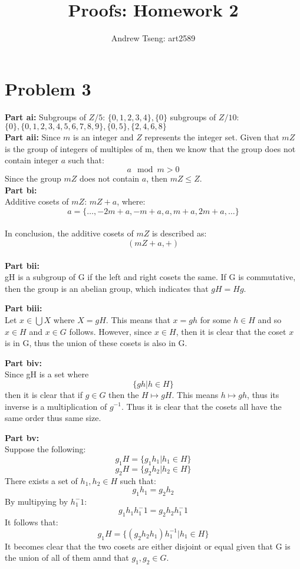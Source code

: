\documentclass[10pt]{amsart}
\title{Proofs: Homework 2}
\author{Andrew Tseng: art2589}
\begin{document}
\maketitle
\thispagestyle{empty}

\section*{\large \textbf{Problem 3}}

\begin{addmargin}{5pt}    
\textbf{\large Part ai:} Subgroups of $Z/5$: $\{0,1,2,3,4\}, \{0\}$
subgroups of $Z/10$: $\{0\}, \{0,1,2,3,4,5,6,7,8,9\}, \{0,5\}, \{2,4,6,8\}$ \\

\noindent \textbf{\large Part aii:} Since $m$ is an integer and $Z$ represents 
the integer set. Given that $mZ$ is the group of integers of multiples of m, 
then we know that the group does not contain integer $a$ such that:
\[ a \mod m > 0\] 
Since the group $mZ$ does not contain $a$, then $mZ \leq Z$. \\

\noindent 
\textbf{\large Part bi:} \\ Additive cosets of $mZ$: $mZ + a$, where: 
\[ a = \{ \ldots, -2m + a, -m + a, a, m + a, 2m + a, \ldots\}\] \\
In conclusion, the additive cosets of $mZ$ is described as:
\[(mZ + a, +)\] \\

\noindent
\textbf{\large Part bii:} \\ gH is a subgroup of G if the left and right cosets 
the same. If G is commutative, then the group is an abelian group, which 
indicates that $gH = Hg$.

\noindent
\textbf{\large Part biii:} \\
Let $x \in \bigcup X$ where $X = gH$. This means that $x = gh$ for some $h \in H$ 
and so $x \in H$ and $x \in G$ follows. However, since $x \in H$, then it is clear
that the coset $x$ is in G, thus the union of these cosets is also in G.

\noindent
\textbf{\large Part biv:}  \\
Since gH is a set where 
\[
\{gh | h \in H\}
\]
then it is clear that if $g \in G$ then the $H \mapsto gH$. This means $h \mapsto gh$, 
thus its inverse is a multiplication of $g^{-1}$. Thus it is clear that the cosets
all have the same order thus same size.

\noindent
\textbf{\large Part bv:}   \\
Suppose the following:
\[g_{1}H = \{g_{1}h_{1}| h_{1} \in H\}\]
\[g_{2}H = \{g_{2}h_{2}| h_{2} \in H\}\]
There exists a set of $h_{1}, h_{2} \in H$ such that:
\[g_{1}h_{1} = g_{2}h_{2}\]
By multipying by $h_{1}^-1$:
\[g_{1}h_{1}h_{1}^-1 = g_{2}h_{2}h_{1}^-1\]
It follows that:
\[g_{1}H = \{(g_{2}h_{2}h_{1})h_{1}^{-1} | h_{1} \in H\}\]
It becomes clear that the two cosets are either disjoint or equal given that 
G is the union of all of them annd that $g_{1}, g_{2} \in G$. \\


\end{addmargin}
\end{document}

